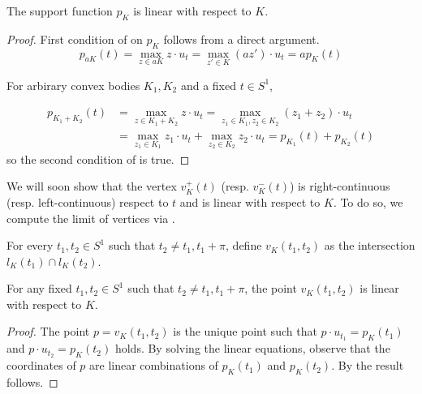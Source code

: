 \begin{proposition}

The support function \(p_K\) is linear with respect to \(K\).

\label{pro:support-function-linear}
\end{proposition}

\begin{proof}
First condition of  on \(p_K\) follows from a direct argument.
\[
p_{aK}(t) = \max_{z \in aK} z \cdot u_t = \max_{z' \in K} (az') \cdot u_t = a p_K(t)
\]

For arbirary convex bodies \(K_1, K_2\) and a fixed \(t \in S^1\),

\begin{align*}
p_{K_1 + K_2} (t) & = \max_{z \in K_1 + K_2} z \cdot u_t = \max_{z_1 \in K_1, z_2 \in K_2} (z_1 + z_2) \cdot u_t \\
& = \max_{z_1 \in K_1} z_1 \cdot u_t + \max_{z_2 \in K_2} z_2 \cdot u_t = p_{K_1}(t) + p_{K_2}(t)
\end{align*}
so the second condition of  is true.
\end{proof}

We will soon show that the vertex \(v_K^{+}(t)\) (resp. \(v_K^-(t)\)) is right-continuous (resp. left-continuous) respect to \(t\) and is linear with respect to \(K\). To do so, we compute the limit of vertices via .

\begin{definition}

For every \(t_1, t_2 \in S^1\) such that \(t_2 \neq t_1, t_1 + \pi\), define \(v_K(t_1, t_2)\) as the intersection \(l_K(t_1) \cap l_K(t_2)\).

\label{def:convex-body-tangent-lines-intersection}
\end{definition}

\begin{lemma}

For any fixed \(t_1, t_2 \in S^1\) such that \(t_2 \neq t_1, t_1 + \pi\), the point \(v_K(t_1, t_2)\) is linear with respect to \(K\).

\label{lem:tangent-lines-intersection-linear}
\end{lemma}

\begin{proof}
The point \(p = v_K(t_1, t_2)\) is the unique point such that \(p \cdot u_{t_1} = p_K(t_1)\) and \(p \cdot u_{t_2} = p_K(t_2)\) holds. By solving the linear equations, observe that the coordinates of \(p\) are linear combinations of \(p_K(t_1)\) and \(p_K(t_2)\). By  the result follows.
\end{proof}


